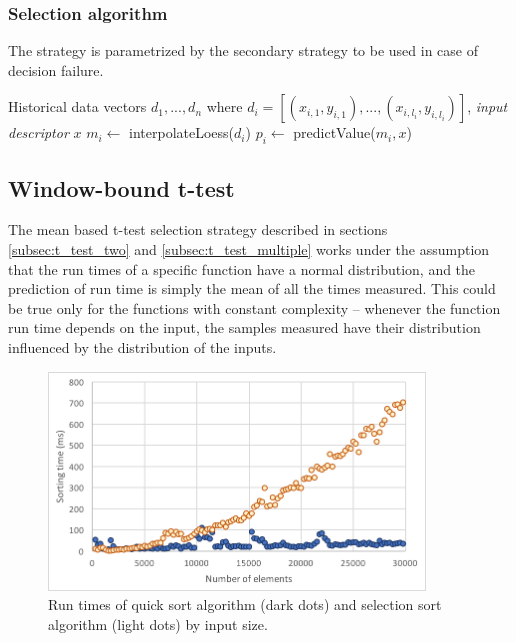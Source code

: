 \subsubsection{Selection algorithm}

The strategy is parametrized by the secondary strategy to be used in case of decision failure.

\begin{algorithmic}[1] %
	\INPUT Historical data vectors $d_1,...,d_n$ where $d_i = [(x_{i,1}, y_{i,1}),...,(x_{i,l_i}, y_{i,l_i})]$, \textit{input descriptor} $x$
	\State $m_i \gets$ interpolateLoess($d_i$)
	\State $p_i \gets$ predictValue($m_i, x$)
	\State{}
	\EndIf
	\EndFor
	\State{}
\end{algorithmic}

\subsection{Window-bound t-test}
\label{subsec:window_bound_t_test}

The mean based t-test selection strategy described in sections \ref{subsec:t_test_two} and \ref{subsec:t_test_multiple} works under the assumption that the run times of a specific function have a normal distribution, and the prediction of run time is simply the mean of all the times measured. This could be true only for the functions with constant complexity -- whenever the function run time depends on the input, the samples measured have their distribution influenced by the distribution of the inputs.

\begin{figure}[h!]
	\captionsetup{justification=centering,margin=0.5cm}
	\centerline{\mbox{\includegraphics[width=100mm]{./img/quick_vs_selection.png}}}
	\caption{Run times of quick sort algorithm (dark dots) and selection sort algorithm (light dots) by input size.}
	\label{fig:quick_vs_selection}
\end{figure}

